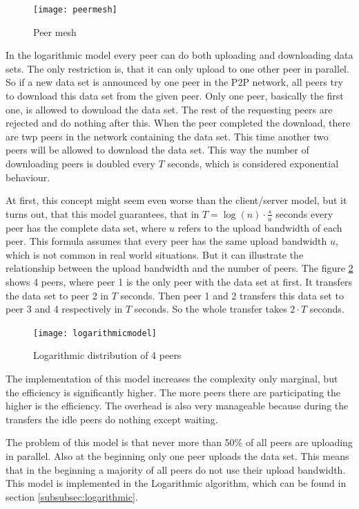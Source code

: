 \begin{figure}[H]
\centering
\texttt{[image: peermesh]}
\caption{Peer mesh}
\label{fig:peermesh}
\end{figure}

In the logarithmic model every peer can do both uploading and downloading data sets. The only restriction is, that it can only upload to one other peer in parallel. So if a new data set is announced by one peer in the P2P network, all peers try to download this data set from the given peer. Only one peer, basically the first one, is allowed to download the data set. The rest of the requesting peers are rejected and do nothing after this. When the peer completed the download, there are twp peers in the network containing the data set. This time another two peers will be allowed to download the data set. This way the number of downloading peers is doubled every $T$ seconds, which is considered exponential behaviour. 

At first, this concept might seem even worse than the client/server model, but it turns out, that this model guarantees, that in $T=\log{(n)} \cdot \frac{s}{u}$  seconds every peer has the complete data set, where $u$ refers to the upload bandwidth of each peer. This formula assumes that every peer has the same upload bandwidth $u$, which is not common in real world situations. But it can illustrate the relationship between the upload bandwidth and the number of peers. The figure \ref{fig:logarithmicmodel} shows 4 peers, where peer 1 is the only peer with the data set at first. It transfers the data set to peer 2 in $T$ seconds. Then peer 1 and 2 transfers this data set to peer 3 and 4 respectively in $T$ seconds. So the whole transfer takes $2 \cdot T$ seconds.

\begin{figure}[H]
\centering
\texttt{[image: logarithmicmodel]}
\caption{Logarithmic distribution of 4 peers}
\label{fig:logarithmicmodel}
\end{figure}

The implementation of this model increases the complexity only marginal, but the efficiency is significantly higher. The more peers there are participating the higher is the efficiency. The overhead is also very manageable because during the transfers the idle peers do nothing except waiting. 

The problem of this model is that never more than 50\% of all peers are uploading in parallel. Also at the beginning only one peer uploads the data set. This means that in the beginning a majority of all peers do not use their upload bandwidth. This model is implemented in the Logarithmic algorithm, which can be found in section \ref{subsubsec:logarithmic}.

